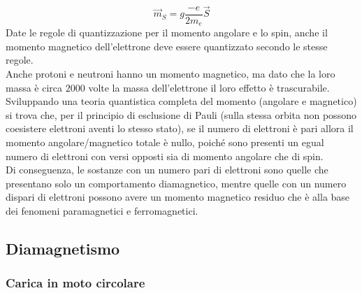 \documentclass[]{article}
\begin{document}
\begin{equation}
	\vec{m}_S = g \frac{-e}{2m_e}\vec{S}
	\label{eq:2}
\end{equation}
Date le regole di quantizzazione per il momento angolare e lo spin, anche il momento magnetico dell'elettrone deve essere quantizzato secondo le stesse regole. \\ 
%
Anche protoni e neutroni hanno un momento magnetico, ma dato che la loro massa è circa $ 2000 $ volte la massa dell'elettrone il loro effetto è trascurabile. \\ 
%
Sviluppando una teoria quantistica completa del momento (angolare e magnetico) si trova che, per il principio di esclusione di Pauli (sulla stessa orbita non possono coesistere elettroni aventi lo stesso stato), se il numero di elettroni è pari allora il momento angolare/magnetico totale è nullo, poiché sono presenti un egual numero di elettroni con versi opposti sia di momento angolare che di spin. \\ 
Di conseguenza, le sostanze con un numero pari di elettroni sono quelle che presentano solo un comportamento diamagnetico, mentre quelle con un numero dispari di elettroni possono avere un momento magnetico residuo che è alla base dei fenomeni paramagnetici e ferromagnetici.

\subsection{Diamagnetismo}

\subsubsection{Carica in moto circolare}
\end{document}
